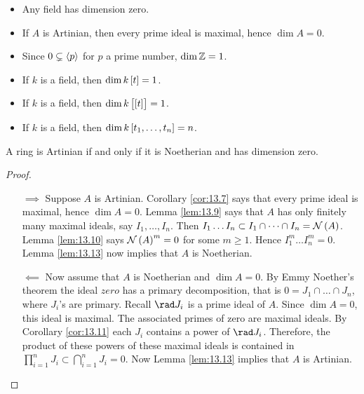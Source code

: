 \begin{example*}
\hfill
\begin{itemize}
\item Any field has dimension zero.
\item If $ A $ is Artinian, then every prime ideal is maximal, hence $ \dim A = 0 $.
\item Since $ 0 \subsetneq \left\langle p \right\rangle $ for $ p $ a prime number, $ \dim \mathbb{Z} = 1 $.
\item If $ k $ is a field, then $ \dim k\sbr{t} = 1 $.
\item If $ k $ is a field, then $ \dim k\sbr{\sbr{t}} = 1 $.
\item If $ k $ is a field, then $ \dim k\sbr{t_1, \dots, t_n} = n $.
\end{itemize}
\end{example*}

\begin{theorem}
\label{thm:13.15}
A ring is Artinian if and only if it is Noetherian and has dimension zero.
\end{theorem}

\begin{proof}
\hfill
\begin{itemize}
\item[$ \implies $] Suppose $ A $ is Artinian. Corollary \ref{cor:13.7} says that every prime ideal is maximal, hence $ \dim A = 0 $. Lemma \ref{lem:13.9} says that $ A $ has only finitely many maximal ideals, say $ I_1, \dots, I_n $. Then $ I_1 \dots I_n \subset I_1 \cap \dots \cap I_n = \NNN\br{A} $. Lemma \ref{lem:13.10} says $ \NNN\br{A}^m = 0 $ for some $ m \ge 1 $. Hence $ I_1^m \dots I_n^m = 0 $. Lemma \ref{lem:13.13} now implies that $ A $ is Noetherian.
\item[$ \impliedby $] Now assume that $ A $ is Noetherian and $ \dim A = 0 $. By Emmy Noether's theorem the ideal $ zero $ has a primary decomposition, that is $ 0 = J_1 \cap \dots \cap J_n $, where $ J_i $'s are primary. Recall $ \rad J_i $ is a prime ideal of $ A $. Since $ \dim A = 0 $, this ideal is maximal. The associated primes of zero are maximal ideals. By Corollary \ref{cor:13.11} each $ J_i $ contains a power of $ \rad J_i $. Therefore, the product of these powers of these maximal ideals is contained in $ \prod_{i = 1}^n J_i \subset \bigcap_{i = 1}^n J_i = 0 $. Now Lemma \ref{lem:13.13} implies that $ A $ is Artinian.
\end{itemize}
\end{proof}

\pagebreak

